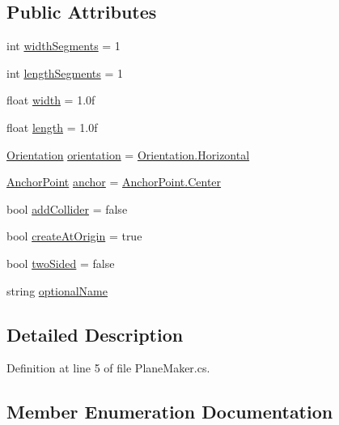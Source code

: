 \subsection*{Public Attributes}
\begin{DoxyCompactItemize}
\item 
int \mbox{\hyperlink{class_create_plane_a48ce62f06b2b42bbba171e06de8300b4}{width\+Segments}} = 1
\item 
int \mbox{\hyperlink{class_create_plane_a81796a428e33c7aaa69c44e517c4f68b}{length\+Segments}} = 1
\item 
float \mbox{\hyperlink{class_create_plane_a8479577416646d58f363f3ce6b1ca8e3}{width}} = 1.\+0f
\item 
float \mbox{\hyperlink{class_create_plane_a924e6d3ac70cc05fa8c7bdf11c41e98a}{length}} = 1.\+0f
\item 
\mbox{\hyperlink{class_create_plane_a7db5f8e98159fe90f49c5ede4e04a3d2}{Orientation}} \mbox{\hyperlink{class_create_plane_af21e407adb4901ade91a4d054cb8524c}{orientation}} = \mbox{\hyperlink{class_create_plane_a7db5f8e98159fe90f49c5ede4e04a3d2ac1b5fa03ecdb95d4a45dd1c40b02527f}{Orientation.\+Horizontal}}
\item 
\mbox{\hyperlink{class_create_plane_a9355b690af33c2b449c1ce539006ecfc}{Anchor\+Point}} \mbox{\hyperlink{class_create_plane_aade926f82883a18f1f7be97e40de3934}{anchor}} = \mbox{\hyperlink{class_create_plane_a9355b690af33c2b449c1ce539006ecfca4f1f6016fc9f3f2353c0cc7c67b292bd}{Anchor\+Point.\+Center}}
\item 
bool \mbox{\hyperlink{class_create_plane_a2295e919f3e627a60a92e34d04c2fe53}{add\+Collider}} = false
\item 
bool \mbox{\hyperlink{class_create_plane_acf73a30e48463ccd315183a8636cd702}{create\+At\+Origin}} = true
\item 
bool \mbox{\hyperlink{class_create_plane_ab8f0c3f67b4058cda42d45414b0a61b8}{two\+Sided}} = false
\item 
string \mbox{\hyperlink{class_create_plane_a12c6b16b4c4ec02fc502ac73d28d235b}{optional\+Name}}
\end{DoxyCompactItemize}


\subsection{Detailed Description}


Definition at line 5 of file Plane\+Maker.\+cs.



\subsection{Member Enumeration Documentation}
\mbox{\label{class_create_plane_a9355b690af33c2b449c1ce539006ecfc}} 
